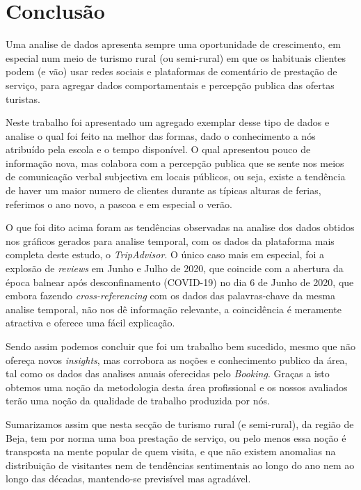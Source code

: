  \chapter{Conclusão}
\label{cap10}

Uma analise de dados apresenta sempre uma oportunidade de crescimento, em especial num meio de turismo rural (ou semi-rural) em que os habituais clientes podem (e vão) usar redes sociais e plataformas de comentário de prestação de serviço, para agregar dados comportamentais e percepção publica das ofertas turistas.

Neste trabalho foi apresentado um agregado exemplar desse tipo de dados e analise o qual foi feito na melhor das formas, dado o conhecimento a nós atribuído pela escola e o tempo disponível. O qual apresentou pouco de informação nova, mas colabora com a percepção publica que se sente nos meios de comunicação verbal subjectiva em locais públicos, ou seja, existe a tendência de haver um maior numero de clientes durante as típicas alturas de ferias, referimos o ano novo, a pascoa e em especial o verão.

O que foi dito acima foram as tendências observadas na analise dos dados obtidos nos gráficos gerados para analise temporal, com os dados da plataforma mais completa deste estudo, o \textit{TripAdvisor}. O único caso mais em especial, foi a explosão de \textit{reviews} em Junho e Julho de 2020, que coincide com a abertura da época balnear após desconfinamento (COVID-19) no dia 6 de Junho de 2020, que embora fazendo \textit{cross-referencing} com os dados das palavras-chave da mesma analise temporal, não nos dê informação relevante, a coincidência é meramente atractiva e oferece uma fácil explicação.

Sendo assim podemos concluir que foi um trabalho bem sucedido, mesmo que não ofereça novos \textit{insights}, mas corrobora as noções e conhecimento publico da área, tal como os dados das analises anuais oferecidas pelo \textit{Booking}. Graças a isto obtemos uma noção da metodologia desta área profissional e os nossos avaliados terão uma noção da qualidade de trabalho produzida por nós.

Sumarizamos assim que nesta secção de turismo rural (e semi-rural), da região de Beja, tem por norma uma boa prestação de serviço, ou pelo menos essa noção é transposta na mente popular de quem visita, e que não existem anomalias na distribuição de visitantes nem de tendências sentimentais ao longo do ano nem ao longo das décadas, mantendo-se previsível mas agradável.